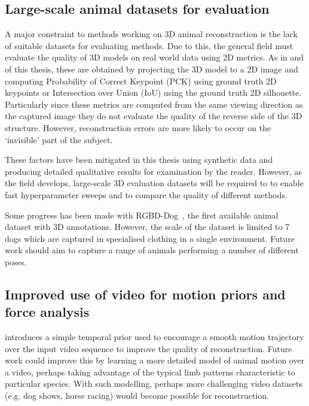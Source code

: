 \subsection{Large-scale animal datasets for evaluation}

A major constraint to methods working on 3D animal reconstruction is the lack of suitable datasets for evaluating methods. Due to this, the general field must evaluate the quality of 3D models on real world data using 2D metrics. As in  and  of this thesis, these are obtained by projecting the 3D model to a 2D image and computing Probability of Correct Keypoint (PCK) using ground truth 2D keypoints or Intersection over Union (IoU) using the ground truth 2D silhouette. Particularly since these metrics are computed from the same viewing direction as the captured image they do not evaluate the quality of the reverse side of the 3D structure. However, reconstruction errors are more likely to occur on the `invisible' part of the subject. 

These factors have been mitigated in this thesis using synthetic data and producing detailed qualitative results for examination by the reader. However, as the field develops, large-scale 3D evaluation datasets will be required to to enable fast hyperparameter sweeps and to compare the quality of different methods. 

Some progress has been made with RGBD-Dog~, the first available animal dataset with 3D annotations. However, the scale of the dataset is limited to 7 dogs which are captured in specialised clothing in a single environment. Future work should aim to capture a range of animals performing a number of different poses. 

\subsection{Improved use of video for motion priors and force analysis}

 introduces a simple temporal prior used to encourage a smooth motion trajectory over the input video sequence to improve the quality of reconstruction. Future work could improve this by learning a more detailed model of animal motion over a video, perhaps taking advantage of the typical limb patterns characteristic to particular species. With such modelling, perhaps more challenging video datasets (e.g. dog shows, horse racing) would become possible for reconstruction. 

